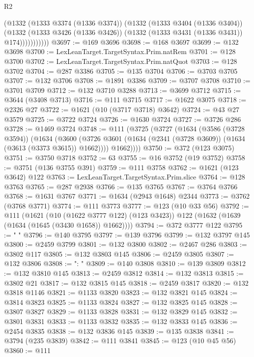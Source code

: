 \begin{lexlean}{R2}
\begin{coremodule}
                  (@1332
                    (@1333 @3374 (@1336 @3374))
                    (@1332
                      (@1333 @3404 (@1336 @3404))
                      (@1332
                        (@1333 @3426 (@1336 @3426))
                        (@1332 (@1333 @3431 (@1336 @3431)) @174)))))))))))
@3697 := @169 @3696
@3698 := @168 @3697
@3699 := @132 @3698
@3700 := LexLeanTarget.TargetSyntax.Prim.natRem
@3701 := @128 @3700
@3702 := LexLeanTarget.TargetSyntax.Prim.natQuot
@3703 := @128 @3702
@3704 := @287 @3386
@3705 := @135 @3704
@3706 := @3703 @3705
@3707 := @132 @3706
@3708 := @1891 @3386
@3709 := @3707 @3708
@3710 := @3701 @3709
@3712 := @132 @3710 @3288
@3713 := @3699 @3712
@3715 := @3644 (@3408 @3713)
@3716 := @111 @3715
@3717 := @1622 @3075
@3718 := @2326 @27
@3722 := @1621 (@10 (@3717 @3718) @3642)
@3724 := @43 @27 @3579
@3725 := @3722 @3724
@3726 := @1630 @3724
@3727 := @3726 @286
@3728 := @1469 @3724
@3748 := @111
    (@3725
      (@3727
        (@1634
          (@3586 (@3728 @3594))
          (@1634
            (@3600 (@3726 @3601 (@1634 (@2341 (@3728 @3609)) (@1634 (@3613 (@3373 @3615)) @1662))))
            @1662))))
@3750 := @372 (@123 @3075)
@3751 := @3750 @3718
@3752 := 63
@3755 := @16 @3752 (@19 @3752)
@3758 := @3751 (@136 @3755 @391)
@3759 := @111 @3758
@3762 := @1621 (@123 @3642) @122
@3763 := LexLeanTarget.TargetSyntax.Prim.slice
@3764 := @128 @3763
@3765 := @287 @2938
@3766 := @135 @3765
@3767 := @3764 @3766
@3768 := @1631 @3767
@3771 := @1634 (@2943 @1648) @2344
@3773 := @3762 (@3768 @3771)
@3774 := @111 @3773
@3777 := @123 (@10 @33 @56)
@3792 := @111
    (@1621
      (@10 (@1622 @3777 @122) (@123 @3423))
      @122
      (@1632 (@1639 (@1634 (@1645 (@3430 @1658)) @1662))))
@3794 := @372 @3777 @122
@3795 := "      "
@3796 := @140 @3795
@3797 := @139 @3796
@3799 := @132 @3797 @145
@3800 := @2459 @3799
@3801 := @132 @3800
@3802 := @2467 @286
@3803 := @3802 @117
@3805 := @132 @3803 @145
@3806 := @2459 @3805
@3807 := @132 @3806
@3808 := ": "
@3809 := @140 @3808
@3810 := @139 @3809
@3812 := @132 @3810 @145
@3813 := @2459 @3812
@3814 := @132 @3813
@3815 := @3802 @21
@3817 := @132 @3815 @145
@3818 := @2459 @3817
@3820 := @132 @3818 @1146
@3821 := @1133 @3820
@3823 := @132 @3821 @145
@3824 := @3814 @3823
@3825 := @1133 @3824
@3827 := @132 @3825 @145
@3828 := @3807 @3827
@3829 := @1133 @3828
@3831 := @132 @3829 @145
@3832 := @3801 @3831
@3833 := @1133 @3832
@3835 := @132 @3833 @145
@3836 := @2454 @3835
@3838 := @132 @3836 @145
@3839 := @135 @3838
@3841 := @3794 (@235 @3839)
@3842 := @111 @3841
@3845 := @123 (@10 @45 @56)
@3860 := @111

\end{coremodule}
\end{lexlean}
